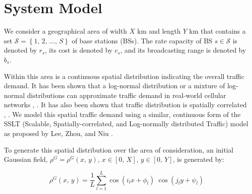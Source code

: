 \documentclass[onecolumn,draftcls]{IEEEtran}
\begin{document}


\section{System Model} \label{sec:model}
We consider a geographical area of width $X$ km and length $Y$ km that contains a set $\mathcal{S} = \left\{1,\, 2,\, \ldots,\, S\right\}$ of base stations (BSs).  The rate capacity of BS $s \in \mathcal{S}$ is denoted by $r_s$, its cost is denoted by $c_s$, and its broadcasting range is denoted by $b_s$.

Within this area is a continuous spatial distribution indicating the overall traffic demand.  It has been shown that a log-normal distribution or a mixture of log-normal distributions can approximate traffic demand in real-world cellular networks \cite{686105}, \cite{5936263}.  It has also been shown that traffic distribution is spatially correlated \cite{5936263}, \cite{eigenplaces}.  We model this spatial traffic demand using a similar, continuous form of the SSLT (Scalable, Spatially-correlated, and Log-normally distributed Traffic) model as proposed by Lee, Zhou, and Niu \cite{6554749}.

To generate this spatial distribution over the area of consideration, an initial Gaussian field, $\rho^G = \rho^G\left(x,\, y\right),\, x \in \left[0,\, X\right],\, y \in \left[0,\, Y\right]$, is generated by:

\begin{equation}
\rho^G\left(x,\, y\right)=\frac{1}{L}\sum_{l=1}^L \cos\left(i_lx+\phi_l\right) \; \cos\left(j_ly+\psi_l\right)
\end{equation}
\end{document}
